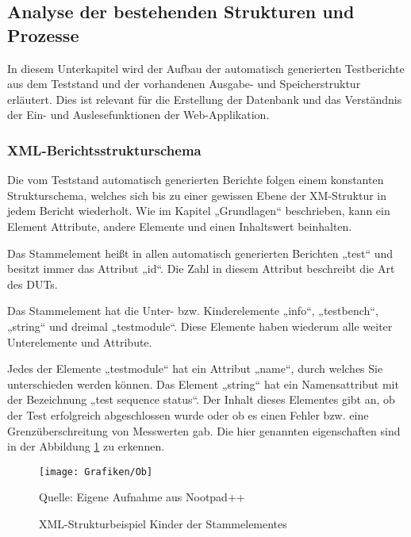 \subsection{Analyse der bestehenden Strukturen und Prozesse}
\label{subsec:analyse-der-bestehenden-strukturen-und-prozesse}

In diesem Unterkapitel wird der Aufbau der automatisch
generierten Testberichte aus dem Teststand und der vorhandenen Ausgabe- und Speicherstruktur
erläutert. Dies ist relevant für die Erstellung der Datenbank und das
Verständnis der Ein- und Auslesefunktionen der Web-Applikation.

\subsubsection{XML-Berichtsstrukturschema}

Die vom Teststand automatisch generierten
Berichte folgen einem konstanten Strukturschema, welches sich bis zu einer
gewissen Ebene der XM-Struktur in jedem Bericht wiederholt. Wie im Kapitel „Grundlagen“
beschrieben, kann ein Element Attribute, andere Elemente und einen Inhaltswert beinhalten.

Das Stammelement heißt in allen automatisch
generierten Berichten „test“ und besitzt immer das Attribut „id“. Die Zahl in
diesem Attribut beschreibt die Art des \ac{DUTs}.

Das Stammelement hat die Unter- bzw.
Kinderelemente „info“, „testbench“, „string“ und dreimal „testmodule“. Diese
Elemente haben wiederum alle weiter Unterelemente und Attribute.

Jedes der Elemente „testmodule“ hat ein Attribut
„name“, durch welches Sie unterschieden werden können. Das Element „string“ hat
ein Namensattribut mit der Bezeichnung „test sequence status“. Der Inhalt
dieses Elementes gibt an, ob der Test erfolgreich abgeschlossen wurde oder ob
es einen Fehler bzw. eine Grenzüberschreitung von Messwerten gab.
Die hier genannten eigenschaften sind in der Abbildung \ref{fig:3. XML-Strukturbeispiel Kinder der Stammelementes} zu erkennen.

\begin{figure}[h]
    \centering
    \texttt{[image: Grafiken/Ob]}
    \caption{XML-Strukturbeispiel Kinder der Stammelementes}
    \label{fig:3. XML-Strukturbeispiel Kinder der Stammelementes}
    {Quelle: Eigene Aufnahme aus Nootpad++}
\end{figure}


